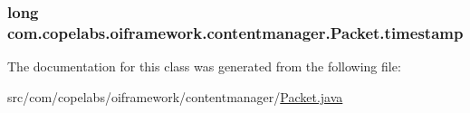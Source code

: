 \subsubsection[{timestamp}]{\setlength{\rightskip}{0pt plus 5cm}long com.\+copelabs.\+oiframework.\+contentmanager.\+Packet.\+timestamp\hspace{0.3cm}{\ttfamily [private]}}\label{classcom_1_1copelabs_1_1oiframework_1_1contentmanager_1_1_packet_abc827d687f006831d6291505f0e31917}


The documentation for this class was generated from the following file\+:\begin{DoxyCompactItemize}
\item 
src/com/copelabs/oiframework/contentmanager/\hyperlink{_packet_8java}{Packet.\+java}\end{DoxyCompactItemize}
